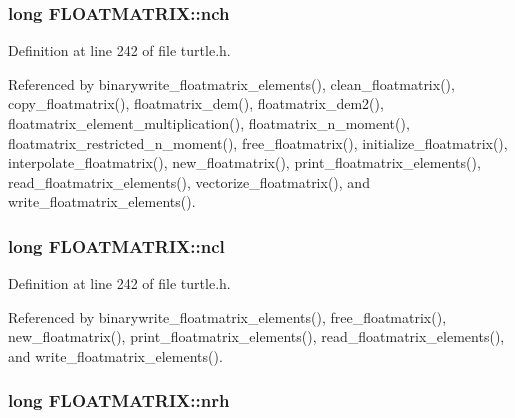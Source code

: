 \hypertarget{struct_f_l_o_a_t_m_a_t_r_i_x_a0c60488f3e973ff5d5bed48ae0c081f8}{
\subsubsection[{nch}]{\setlength{\rightskip}{0pt plus 5cm}long F\-L\-O\-A\-T\-M\-A\-T\-R\-I\-X\-::nch}}\label{struct_f_l_o_a_t_m_a_t_r_i_x_a0c60488f3e973ff5d5bed48ae0c081f8}


Definition at line 242 of file turtle.\-h.



Referenced by binarywrite\-\_\-floatmatrix\-\_\-elements(), clean\-\_\-floatmatrix(), copy\-\_\-floatmatrix(), floatmatrix\-\_\-dem(), floatmatrix\-\_\-dem2(), floatmatrix\-\_\-element\-\_\-multiplication(), floatmatrix\-\_\-n\-\_\-moment(), floatmatrix\-\_\-restricted\-\_\-n\-\_\-moment(), free\-\_\-floatmatrix(), initialize\-\_\-floatmatrix(), interpolate\-\_\-floatmatrix(), new\-\_\-floatmatrix(), print\-\_\-floatmatrix\-\_\-elements(), read\-\_\-floatmatrix\-\_\-elements(), vectorize\-\_\-floatmatrix(), and write\-\_\-floatmatrix\-\_\-elements().

\hypertarget{struct_f_l_o_a_t_m_a_t_r_i_x_a07af39607f22f0440475905f48d840a8}{
\subsubsection[{ncl}]{\setlength{\rightskip}{0pt plus 5cm}long F\-L\-O\-A\-T\-M\-A\-T\-R\-I\-X\-::ncl}}\label{struct_f_l_o_a_t_m_a_t_r_i_x_a07af39607f22f0440475905f48d840a8}


Definition at line 242 of file turtle.\-h.



Referenced by binarywrite\-\_\-floatmatrix\-\_\-elements(), free\-\_\-floatmatrix(), new\-\_\-floatmatrix(), print\-\_\-floatmatrix\-\_\-elements(), read\-\_\-floatmatrix\-\_\-elements(), and write\-\_\-floatmatrix\-\_\-elements().

\hypertarget{struct_f_l_o_a_t_m_a_t_r_i_x_afba4e3aef87b699e1062cf46a319ffc6}{
\subsubsection[{nrh}]{\setlength{\rightskip}{0pt plus 5cm}long F\-L\-O\-A\-T\-M\-A\-T\-R\-I\-X\-::nrh}}\label{struct_f_l_o_a_t_m_a_t_r_i_x_afba4e3aef87b699e1062cf46a319ffc6}


